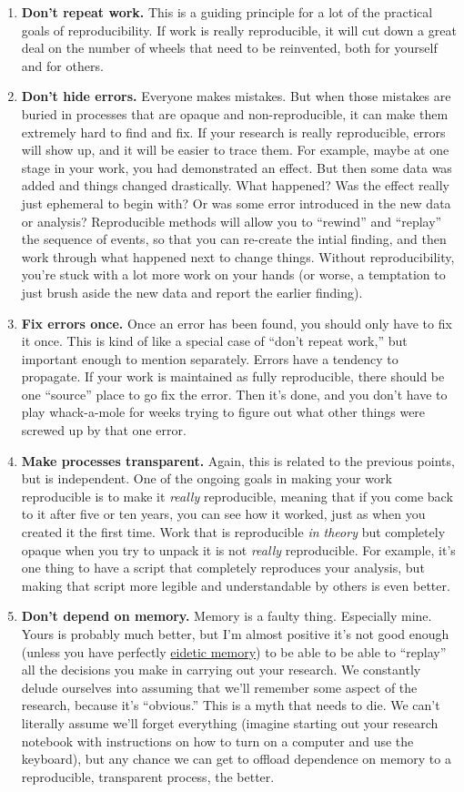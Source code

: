 \documentclass{book}
\begin{document}
\begin{enumerate}
\item \textbf{Don't repeat work.} This is a guiding principle for a lot of the practical goals of reproducibility. If work is really reproducible, it will cut down a great deal on the number of wheels that need to be reinvented, both for yourself and for others.
\item \textbf{Don't hide errors.} Everyone makes mistakes. But when those mistakes are buried in processes that are opaque and non-reproducible, it can make them extremely hard to find and fix.  If your research is really reproducible, errors will show up, and it will be easier to trace them.  For example, maybe at one stage in your work, you had demonstrated an effect. But then some data was added and things changed drastically. What happened? Was the effect really just ephemeral to begin with? Or was some error introduced in the new data or analysis?  Reproducible methods will allow you to ``rewind'' and ``replay'' the sequence of events, so that you can re-create the intial finding, and then work through what happened next to change things. Without reproducibility, you're stuck with a lot more work on your hands (or worse, a temptation to just brush aside the new data and report the earlier finding).
\item \textbf{Fix errors once.} Once an error has been found, you should only have to fix it once.  This is kind of like a special case of ``don't repeat work,'' but important enough to mention separately. Errors have a tendency to propagate. If your work is maintained as fully reproducible, there should be one ``source'' place to go fix the error.  Then it's done, and you don't have to play whack-a-mole for weeks trying to figure out what other things were screwed up by that one error.
\item \textbf{Make processes transparent.} Again, this is related to the previous points, but is independent.  One of the ongoing goals in making your work reproducible is to make it \emph{really} reproducible, meaning that if you come back to it after five or ten years, you can see how it worked, just as when you created it the first time.  Work that is reproducible \emph{in theory} but completely opaque when you try to unpack it is not \emph{really} reproducible. For example, it's one thing to have a script that completely reproduces your analysis, but making that script more legible and understandable by others is even better.
\item \textbf{Don't depend on memory.} Memory is a faulty thing. Especially mine. Yours is probably much better, but I'm almost positive it's not good enough (unless you have perfectly \href{http://en.wikipedia.org/wiki/Eidetic_memory}{eidetic memory}) to be able to be able to ``replay'' all the decisions you make in carrying out your research. We constantly delude ourselves into assuming that we'll remember some aspect of the research, because it's ``obvious.''  This is a myth that needs to die. We can't literally assume we'll forget everything (imagine starting out your research notebook with instructions on how to turn on a computer and use the keyboard), but any chance we can get to offload dependence on memory to a reproducible, transparent process, the better.

\end{enumerate}
\end{document}
